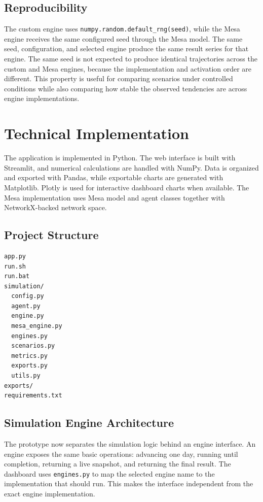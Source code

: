 \documentclass[12pt,a4paper]{article}
\begin{document}
\subsection{Reproducibility}

The custom engine uses \texttt{numpy.random.default\_rng(seed)}, while the Mesa engine receives the same configured seed through the Mesa model. The same seed, configuration, and selected engine produce the same result series for that engine. The same seed is not expected to produce identical trajectories across the custom and Mesa engines, because the implementation and activation order are different. This property is useful for comparing scenarios under controlled conditions while also comparing how stable the observed tendencies are across engine implementations.

\section{Technical Implementation}

The application is implemented in Python. The web interface is built with Streamlit, and numerical calculations are handled with NumPy. Data is organized and exported with Pandas, while exportable charts are generated with Matplotlib. Plotly is used for interactive dashboard charts when available. The Mesa implementation uses Mesa model and agent classes together with NetworkX-backed network space.

\subsection{Project Structure}

\begin{verbatim}
app.py
run.sh
run.bat
simulation/
  config.py
  agent.py
  engine.py
  mesa_engine.py
  engines.py
  scenarios.py
  metrics.py
  exports.py
  utils.py
exports/
requirements.txt
\end{verbatim}

\subsection{Simulation Engine Architecture}

The prototype now separates the simulation logic behind an engine interface. An engine exposes the same basic operations: advancing one day, running until completion, returning a live snapshot, and returning the final result. The dashboard uses \texttt{engines.py} to map the selected engine name to the implementation that should run. This makes the interface independent from the exact engine implementation.
\end{document}
